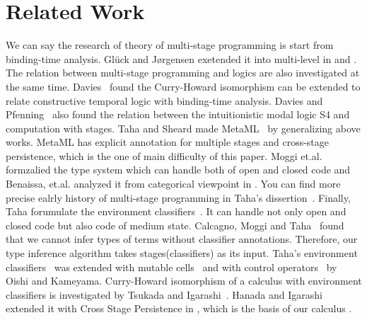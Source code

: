 
\section{Related Work}
\label{sec:related-work}



We can say the research of theory of multi-stage programming is start from
binding-time analysis\cite{Nielson1992TwoLevel}. Gl{\"u}ck and J{\o}rgensen
exetended it into multi-level in \cite{GluckJorgensen1995Efficient} and
\cite{GluckJorgensen1996Fast}. The relation between multi-stage programming and
logics are also investigated at the same time. Davies~\cite{Davis1996Temporal}
found the Curry-Howard isomorphism can be extended to relate constructive
temporal logic with binding-time analysis. Davies and
Pfenning~\cite{DaviesPfenning1996Modal} also found the relation between the
intuitionistic modal logic S4 and computation with stages. Taha and Sheard made
MetaML~\cite{TahaSheard1997MetaML} by generalizing above works. MetaML has
explicit annotation for multiple stages and cross-stage persistence, which is
the one of main difficulty of this paper. Moggi
et.al.~\cite{MoggiTahaBenaissaSheard99ESOP} formzalied the type system which
can handle both of open and closed code and Benaissa, et.al. analyzed it from
categorical viewpoint in \cite{BenaissaMoggiTahaSheard1999Logical}. You can
find more precise ealrly history of multi-stage programming in Taha's
dissertion~\cite{Taha1999Multi}. Finally, Taha forumulate the environment
classifiers~\cite{TahaNielsen2003Environment}. It can handle not only open and
closed code but also code of medium state. Calcagno, Moggi and
Taha~\cite{CalcagnoMoggiTaha2004InferenceClassifiers} found that we cannot
infer types of terms without classifier annotations. Therefore, our type
inference algorithm takes stages(classifiers) as its input. Taha's environment
classifiers~\cite{TahaNielsen2003Environment} was extended with mutable
cells~\cite{KiselyovKameyamaSudo2016Refined} and with control
operators~\cite{OishiKameyama2017ControlOperators} by Oishi and Kameyama.
Curry-Howard isomorphism of a calculus with environment classifiers is
investigated by Tsukada and Igarashi~\cite{TsukadaIgarashi2010Logical}. Hanada
and Igarashi extended it with Cross Stage Persistence in
\cite{HanadaIgarashi2014CSP}, which is the basis of our calculus \LMD.


